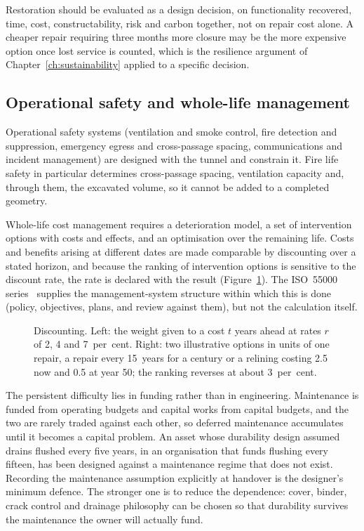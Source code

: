 Restoration should be evaluated as a design decision, on functionality
recovered, time, cost, constructability, risk and carbon together, not on
repair cost alone. A cheaper repair requiring three months more closure may be
the more expensive option once lost service is counted, which is the resilience
argument of Chapter~\ref{ch:sustainability} applied to a specific decision.

\subsection{Operational safety and whole-life management}
\label{sec:operational-whole-life}

Operational safety systems (ventilation and smoke control, fire detection
and suppression, emergency egress and cross-passage spacing, communications
and incident management) are designed with the tunnel and constrain it. Fire
life safety in particular determines cross-passage spacing, ventilation
capacity and, through them, the excavated volume, so it cannot be added to a
completed geometry.

Whole-life cost management requires a deterioration model, a set of
intervention options with costs and effects, and an optimisation over the
remaining life. Costs and benefits arising at different dates are made
comparable by discounting over a stated horizon, and because the ranking of
intervention options is sensitive to the discount rate, the rate is declared
with the result (Figure~\ref{fig:discounting}). The ISO~55000 series~\citep{iso55000} supplies the
management-system structure within which this is done (policy, objectives,
plans, and review against them), but not the calculation itself.

\begin{figure}[htbp]
\centering
{}
\caption{Discounting. Left: the weight given to a cost $t$ years ahead at rates $r$ of 2, 4 and 7~per~cent. Right: two illustrative options in units of one repair, a repair every 15~years for a century or a relining costing 2.5 now and 0.5 at year 50; the ranking reverses at about 3~per~cent.}
\label{fig:discounting}
\end{figure}

The persistent difficulty lies in funding rather than in engineering. Maintenance is funded from
operating budgets and capital works from capital budgets, and the two are
rarely traded against each other, so deferred maintenance accumulates until it
becomes a capital problem. An asset whose durability design assumed drains
flushed every five years, in an organisation that funds flushing every
fifteen, has been designed against a maintenance regime that does not exist.
Recording the maintenance assumption explicitly at handover is the designer's
minimum defence. The stronger one is to reduce the dependence: cover, binder,
crack control and drainage philosophy can be chosen so that durability
survives the maintenance the owner will actually fund.

